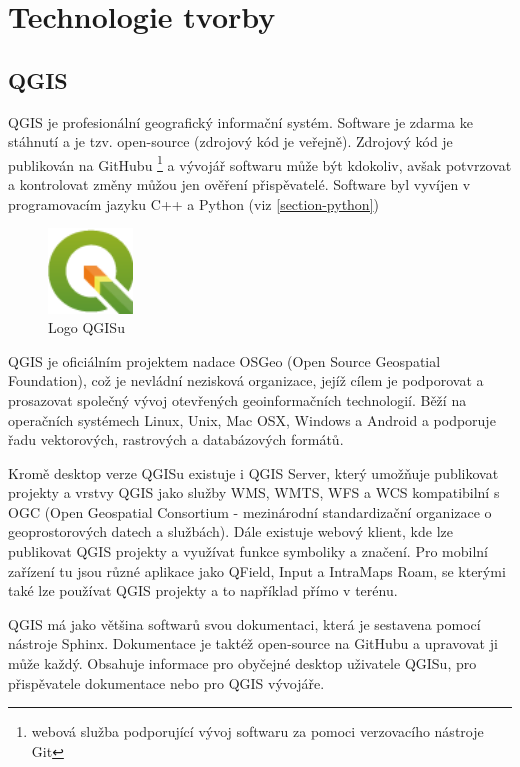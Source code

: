 \chapter{Technologie tvorby}
\label{4-technologie}

\section{QGIS}

QGIS je profesionální geografický informační systém.
Software je zdarma ke stáhnutí a je tzv. open-source (zdrojový kód je veřejně).
Zdrojový kód je publikován na GitHubu \footnote{webová služba podporující vývoj softwaru za pomoci verzovacího nástroje Git}
a vývojář softwaru může být kdokoliv, avšak potvrzovat a kontrolovat změny můžou jen ověření
přispěvatelé. Software byl vyvíjen v programovacím jazyku C++ a Python (viz \ref{section-python})

\begin{figure}[H] \centering
    \includegraphics[width=64pt]{./pictures/qgis-logo.png}
    \caption[Logo QGISu]{Logo QGISu \cite{qgis}}
	\label{fig:qgis-logo}                                
\end{figure}

QGIS je oficiálním projektem nadace OSGeo (Open Source Geospatial Foundation), což je nevládní 
nezisková organizace, jejíž cílem je podporovat a prosazovat společný vývoj otevřených geoinformačních
technologií. Běží na operačních systémech Linux, Unix, Mac OSX, Windows a Android a podporuje
řadu vektorových, rastrových a databázových formátů.

Kromě desktop verze QGISu existuje i QGIS Server, který umožňuje publikovat projekty a vrstvy
QGIS jako služby WMS, WMTS, WFS a WCS kompatibilní s OGC (Open Geospatial Consortium - mezinárodní standardizační organizace
o geoprostorových datech a službách). Dále existuje webový klient, kde lze publikovat
QGIS projekty a využívat funkce symboliky a značení. Pro mobilní zařízení tu jsou
různé aplikace jako QField, Input a IntraMaps Roam, se kterými také lze používat QGIS projekty a to 
například přímo v terénu. 


QGIS má jako většina softwarů svou dokumentaci, která je sestavena pomocí nástroje Sphinx. 
Dokumentace je taktéž open-source na GitHubu a upravovat ji může každý. Obsahuje
informace pro obyčejné desktop uživatele QGISu, pro přispěvatele dokumentace nebo pro QGIS
vývojáře.

